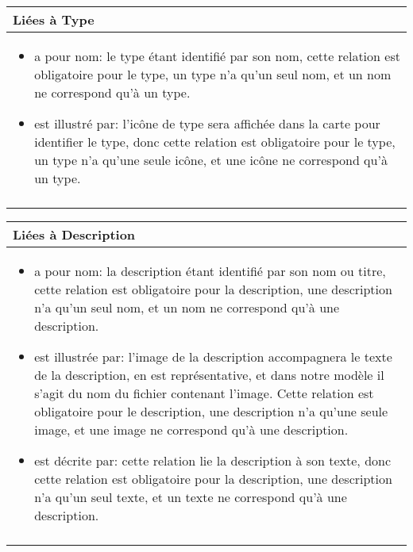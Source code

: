 \documentclass[a4paper,10pt]{article}
\begin{document}
\begin{tabu}{X}
\textbf{Liées à Type}\\
\toprule

\begin{itemize}
    \item a pour nom: le type étant identifié par son nom, cette relation est obligatoire pour le type, un type n'a qu'un seul nom, et un nom ne correspond qu'à un type.
    \item est illustré par: l'icône de type sera affichée dans la carte pour identifier le type, donc cette relation est obligatoire pour le type, un type n'a qu'une seule icône, et une icône ne correspond qu'à un type.
\end{itemize}
\\\\
\end{tabu}

\begin{tabu}{X}
\textbf{Liées à Description}\\
\toprule

\begin{itemize}
    \item a pour nom: la description étant identifié par son nom ou titre, cette relation est obligatoire pour la description, une description n'a qu'un seul nom, et un nom ne correspond qu'à une description.
    \item est illustrée par: l'image de la description accompagnera le texte de la description, en est représentative, et dans notre modèle il s'agit du nom du fichier contenant l'image. Cette relation est obligatoire pour le description, une description n'a qu'une seule image, et une image ne correspond qu'à une description.
    \item est décrite par: cette relation lie la description à son texte, donc cette relation est obligatoire pour la description, une description n'a qu'un seul texte, et un texte ne correspond qu'à une description.
\end{itemize}
\\\\
\end{tabu}
\end{document}
